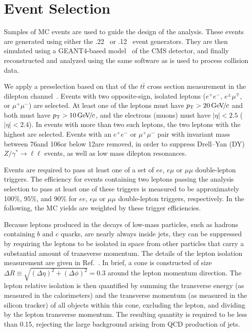 \section{Event Selection}
\label{sec:eventSel}

Samples of  MC events are used to  guide the  design of  the analysis.
These      events     are      generated     using      either     the
.22~\cite{Pythia}  or  .12~\cite{Madgraph} event
generators.    They   are   then   simulated  using   a   GEANT4-based
model~\cite{Geant} of the CMS  detector, and finally reconstructed and
analyzed using the same software as is used to process collision data.

We apply a  preselection   based  on  that of the $t\bar{t}$  cross section
measurement in  the dilepton channel~\cite{ref:top}.  Events
with     two     opposite-sign,     isolated    leptons     ($e^+e^-$,
$e^{\pm}\mu^{\mp}$, or $\mu^+\mu^-$) are selected. At least one of the leptons must
have  $p_{\mathrm{T}} >  20{\,\text{Ge\hspace{-.08em}V\hspace{-0.16em}/\hspace{-0.08em}}c}$ and  both must  have $p_{\mathrm{T}}  > 10{\,\text{Ge\hspace{-.08em}V\hspace{-0.16em}/\hspace{-0.08em}}c}$,  and the
electrons (muons) must have $|\eta| < 2.5$ ($|\eta| < 2.4$). In events
with more  than two such leptons,   the two  leptons with the
highest \pt are selected.  Events with an $e^+e^-$  or $\mu^+\mu^-$ pair
with  invariant mass  between 76\GeVcc  and  106\GeVcc or  below
12\GeVcc are removed, in  order      to     suppress     Drell--Yan  (DY)
$Z/\gamma^{*}\to\ell\ell$  events,  as  well  as   low  mass  dilepton
resonances.

Events are required to pass  at least one  of a set of $ee$, $e\mu$ or $\mu\mu$
double-lepton triggers.  The  efficiency for events containing two 
leptons passing the analysis selection to  pass at  least  one of  these
triggers  is measured to be approximately 100\%, 95\%, and 90\%
for $ee$, $e\mu$ or $\mu\mu$ double-lepton triggers, respectively.
In the following, the MC yields are weighted by these trigger efficiencies.

Because leptons produced in the  decays of low-mass particles, such as
hadrons containing $b$  and $c$ quarks,  are  nearly  always inside  jets,  they can  be
suppressed by requiring the leptons to be isolated in space from other
particles that carry a  substantial amount of transverse momentum. The
details   of   the  lepton   isolation   measurement   are  given   in
Ref.~\cite{ref:top}.   In  brief,   a cone is constructed     of  size
$\Delta{}R\equiv\sqrt{(\Delta\eta)^2+(\Delta\phi)^2}=0.3$  around  the
lepton  momentum  direction. The  lepton  relative  isolation is  then
quantified  by  summing the  transverse  energy  (as  measured in  the
calorimeters) and the transverse  momentum (as measured in the silicon
tracker) of  all objects  within this cone,  excluding the  lepton, and
dividing by  the lepton transverse momentum. The resulting quantity
is required to be  less than 0.15, rejecting
the large background arising from QCD production of jets.

